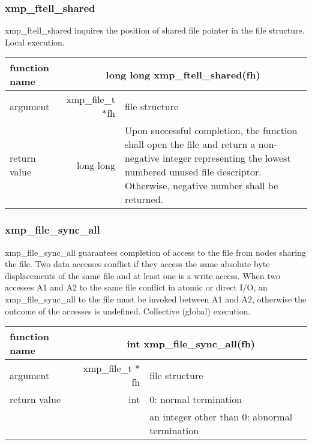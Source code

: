    \subsubsection{xmp\_ftell\_shared}
   xmp\_ftell\_shared inquires the position of shared file pointer in the file structure. Local execution.

   \begin{table}[h]
    \begin{center}
     \begin{tabular}{|l|r|p{80mm}|}
      \hline
      {\bf function name}  & \multicolumn{2}{c|}{\bf long long
      xmp\_ftell\_shared(fh)} \\ \hline \hline
      argument & xmp\_file\_t $*$fh & file structure \\ \hline
      return value & long long & Upon successful completion, the
	      function shall open the file and return a non-negative
	      integer representing the lowest numbered unused file
	      descriptor. Otherwise, negative number shall be
	      returned. \\ \hline
      \end{tabular}
     \end{center}
    \label{tb:aaa}
   \end{table}

   \clearpage
   
   \subsubsection{xmp\_file\_sync\_all}
   xmp\_file\_sync\_all guarantees completion of access to the file from nodes sharing the file.
   Two data accesses conflict if they access the same absolute byte displacements of the same file and at least one is a write access.
   When two accesses A1 and A2 to the same file conflict in atomic or direct I/O, an xmp\_file\_sync\_all to the file must be invoked between A1 and A2, otherwise the outcome of the accesses is undefined.   
   Collective (global) execution.


   \begin{table}[h]
    \begin{center}
     \begin{tabular}{|l|r|p{80mm}|}
      \hline
      {\bf function name}  & \multicolumn{2}{c|}{\bf int
      xmp\_file\_sync\_all(fh)} \\ \hline \hline
      argument & xmp\_file\_t $*$fh & file structure \\ \hline
      return value & int & 0: normal termination \\
      &  & an integer other than 0: abnormal termination \\ \hline
      \end{tabular}
     \end{center}
    \label{tb:aaa}
   \end{table}

